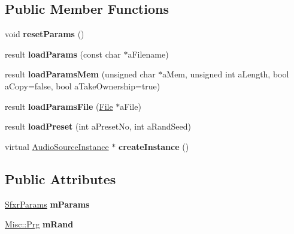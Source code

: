 \subsection*{Public Member Functions}
\begin{DoxyCompactItemize}
\item 
\mbox{\label{class_so_loud_1_1_sfxr_a5137ecc26f9d99a11a8c5cc0a31a2b81}} 
void {\bfseries reset\+Params} ()
\item 
\mbox{\label{class_so_loud_1_1_sfxr_a2f0d61ef7e75a28cb7ba3d93cce222b5}} 
result {\bfseries load\+Params} (const char $\ast$a\+Filename)
\item 
\mbox{\label{class_so_loud_1_1_sfxr_a0e66c7c1fbbb13eaec6c3f69043ed84f}} 
result {\bfseries load\+Params\+Mem} (unsigned char $\ast$a\+Mem, unsigned int a\+Length, bool a\+Copy=false, bool a\+Take\+Ownership=true)
\item 
\mbox{\label{class_so_loud_1_1_sfxr_a5f7e139d3456e480c4dd5e9f890d89c1}} 
result {\bfseries load\+Params\+File} (\mbox{\hyperlink{class_so_loud_1_1_file}{File}} $\ast$a\+File)
\item 
\mbox{\label{class_so_loud_1_1_sfxr_addbf8f2b5cc1606bf6b7662057ba363a}} 
result {\bfseries load\+Preset} (int a\+Preset\+No, int a\+Rand\+Seed)
\item 
\mbox{\label{class_so_loud_1_1_sfxr_abb54685b90754a0bb21faed2fa2d56f0}} 
virtual \mbox{\hyperlink{class_so_loud_1_1_audio_source_instance}{Audio\+Source\+Instance}} $\ast$ {\bfseries create\+Instance} ()
\end{DoxyCompactItemize}
\subsection*{Public Attributes}
\begin{DoxyCompactItemize}
\item 
\mbox{\label{class_so_loud_1_1_sfxr_a83a62945c9e6ee812a94c9f65e109e4e}} 
\mbox{\hyperlink{struct_so_loud_1_1_sfxr_params}{Sfxr\+Params}} {\bfseries m\+Params}
\item 
\mbox{\label{class_so_loud_1_1_sfxr_aca922468fd89ac4436eecaf72b516d9e}} 
\mbox{\hyperlink{class_so_loud_1_1_misc_1_1_prg}{Misc\+::\+Prg}} {\bfseries m\+Rand}
\end{DoxyCompactItemize}


